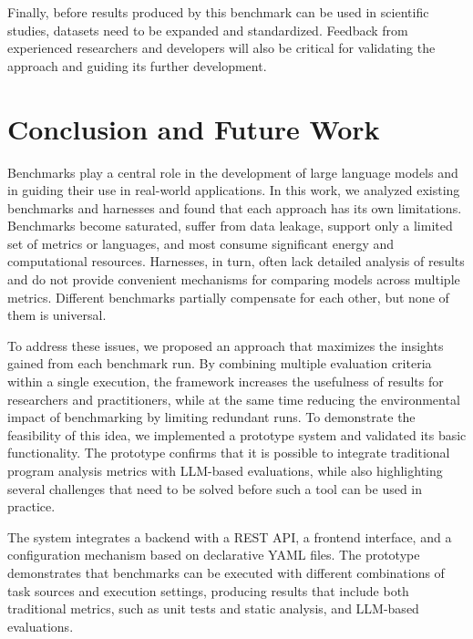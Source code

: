 Finally, before results produced by this benchmark can be used in scientific studies, datasets need to be expanded and standardized.
Feedback from experienced researchers and developers will also be critical for validating the approach and guiding its further development.



\section{Conclusion and Future Work}

Benchmarks play a central role in the development of large language models and in guiding their use in real-world applications.
In this work, we analyzed existing benchmarks and harnesses and found that each approach has its own limitations.
Benchmarks become saturated, suffer from data leakage, support only a limited set of metrics or languages, and most consume significant energy and computational resources.
Harnesses, in turn, often lack detailed analysis of results and do not provide convenient mechanisms for comparing models across multiple metrics.
Different benchmarks partially compensate for each other, but none of them is universal.

To address these issues, we proposed an approach that maximizes the insights gained from each benchmark run.
By combining multiple evaluation criteria within a single execution, the framework increases the usefulness of results for researchers and practitioners, while at the same time reducing the environmental impact of benchmarking by limiting redundant runs.
To demonstrate the feasibility of this idea, we implemented a prototype system and validated its basic functionality.
The prototype confirms that it is possible to integrate traditional program analysis metrics with LLM-based evaluations, while also highlighting several challenges that need to be solved before such a tool can be used in practice.

The system integrates a backend with a REST API, a frontend interface, and a configuration mechanism based on declarative YAML files.
The prototype demonstrates that benchmarks can be executed with different combinations of task sources and execution settings, producing results that include both traditional metrics, such as unit tests and static analysis, and LLM-based evaluations.

